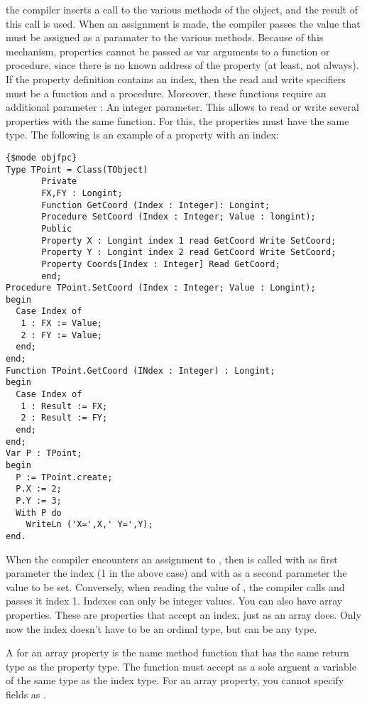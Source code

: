 \documentclass{report}
\begin{document}
the compiler inserts a call to the various  methods of the
object, and the result of this call is used. When an assignment is made,
the compiler passes the value that must be assigned as a paramater to
the various  methods.
Because of this mechanism, properties cannot be passed as var arguments to a
function or procedure, since there is no known address of the property (at
least, not always).
If the property definition contains an index, then the read and write
specifiers must be a function and a procedure. Moreover, these functions
require an additional parameter : An integer parameter. This allows to read
or write several properties with the same function. For this, the properties
must have the same type.
The following is an example of a property with an index:
\begin{verbatim}
{$mode objfpc}
Type TPoint = Class(TObject)
       Private
       FX,FY : Longint;
       Function GetCoord (Index : Integer): Longint;
       Procedure SetCoord (Index : Integer; Value : longint);
       Public
       Property X : Longint index 1 read GetCoord Write SetCoord;
       Property Y : Longint index 2 read GetCoord Write SetCoord;
       Property Coords[Index : Integer] Read GetCoord;
       end;
Procedure TPoint.SetCoord (Index : Integer; Value : Longint);
begin
  Case Index of
   1 : FX := Value;
   2 : FY := Value;
  end;
end;
Function TPoint.GetCoord (INdex : Integer) : Longint;
begin
  Case Index of
   1 : Result := FX;
   2 : Result := FY;
  end;
end;
Var P : TPoint;
begin
  P := TPoint.create;
  P.X := 2;
  P.Y := 3;
  With P do
    WriteLn ('X=',X,' Y=',Y);
end.
\end{verbatim}
When the compiler encounters an assignment to , then 
is called with as first parameter the index (1 in the above case) and with
as a second parameter the value to be set.
Conversely, when reading the value of , the compiler calls
 and passes it index 1.
Indexes can only be integer values.
You can also have array properties. These are properties that accept an
index, just as an array does. Only now the index doesn't have to be an
ordinal type, but can be any type.

A  for an array property is the name method function
that has the same return type as  the property type.
The function must accept as a sole arguent a variable of the same type as
the index type. For an array property, you cannot specify fields as .
\end{document}
